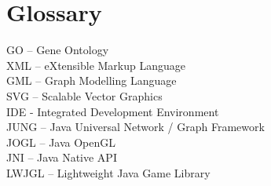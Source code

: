 \section*{Glossary}
\label{sec:glossary}

GO -- Gene Ontology\\
XML -- eXtensible Markup Language\\
GML -- Graph Modelling Language\\
SVG -- Scalable Vector Graphics\\
IDE - Integrated Development Environment \\
JUNG -- Java Universal Network / Graph Framework\\
JOGL -- Java OpenGL\\
JNI -- Java Native API\\
LWJGL -- Lightweight Java Game Library\\